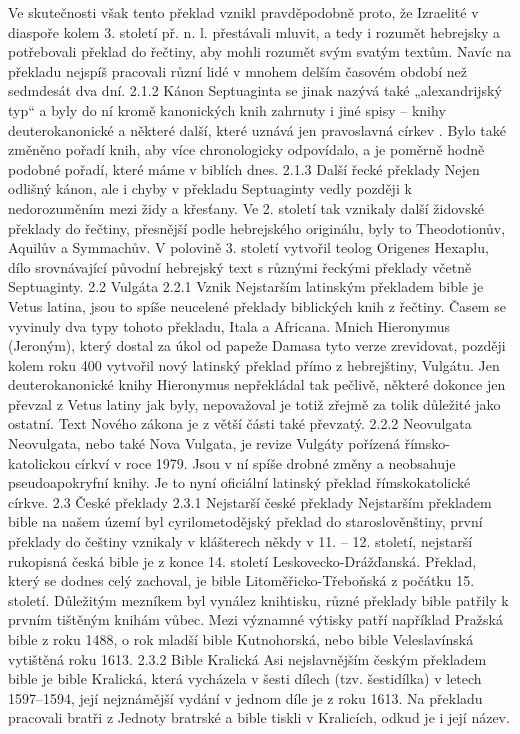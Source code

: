 \documentclass[letterpaper,12pt,oneside]{article}
\begin{document}
\begin{itemize}
Ve skutečnosti však tento překlad vznikl pravděpodobně proto, že Izraelité v diaspoře kolem 3. století př. n. l. přestávali mluvit, a tedy i rozumět hebrejsky a potřebovali překlad do řečtiny, aby mohli rozumět svým svatým textům. Navíc na překladu nejspíš pracovali různí lidé v mnohem delším časovém období než sedmdesát dva dní.
2.1.2	Kánon
Septuaginta se jinak nazývá také „alexandrijský typ“ a byly do ní kromě kanonických knih zahrnuty i jiné spisy – knihy deuterokanonické a některé další, které uznává jen pravoslavná církev . Bylo také změněno pořadí knih, aby více chronologicky odpovídalo, a je poměrně hodně podobné pořadí, které máme v biblích dnes.
2.1.3	Další řecké překlady
Nejen odlišný kánon, ale i chyby v překladu Septuaginty vedly později k nedorozuměním mezi židy a křesťany. Ve 2. století tak vznikaly další židovské překlady do řečtiny, přesnější podle hebrejského originálu, byly to Theodotionův, Aquilův a Symmachův. V polovině 3. století vytvořil teolog Origenes Hexaplu, dílo srovnávající původní hebrejský text s různými řeckými překlady včetně Septuaginty.  
2.2	Vulgáta
2.2.1	Vznik
Nejstarším latinským překladem bible je Vetus latina, jsou to spíše neucelené překlady biblických knih z řečtiny. Časem se vyvinuly dva typy tohoto překladu, Itala a Africana. Mnich Hieronymus (Jeroným), který dostal za úkol od papeže Damasa tyto verze zrevidovat, později kolem roku 400 vytvořil nový latinský překlad přímo z hebrejštiny, Vulgátu. Jen deuterokanonické knihy Hieronymus nepřekládal tak pečlivě, některé dokonce jen převzal z Vetus latiny jak byly, nepovažoval je totiž zřejmě za tolik důležité jako ostatní.  Text Nového zákona je z větší části také převzatý.
2.2.2	Neovulgata
Neovulgata, nebo také Nova Vulgata, je revize Vulgáty pořízená římsko-katolickou církví v roce 1979. Jsou v ní spíše drobné změny a neobsahuje pseudoapokryfní knihy. Je to nyní oficiální latinský překlad římskokatolické církve. 
2.3	České překlady
2.3.1	Nejstarší české překlady
Nejstarším překladem bible na našem území byl cyrilometodějský překlad do staroslověnštiny, první překlady do češtiny vznikaly v klášterech někdy v 11. – 12. století, nejstarší rukopisná česká bible je z konce 14. století Leskovecko-Drážďanská. Překlad, který se dodnes celý zachoval, je bible Litoměřicko-Třeboňská z počátku 15. století.
Důležitým mezníkem byl vynález knihtisku, různé překlady bible patřily k prvním tištěným knihám vůbec. Mezi významné výtisky patří například Pražská bible z roku 1488, o rok mladší bible Kutnohorská, nebo bible Veleslavínská vytištěná roku 1613.  
2.3.2	Bible Kralická
Asi nejslavnějším českým překladem bible je bible Kralická, která vycházela v šesti dílech (tzv. šestidílka) v letech 1597–1594, její nejznámější vydání v jednom díle je z roku 1613. Na překladu pracovali bratři z Jednoty bratrské a bible tiskli v Kralicích, odkud je i její název.

\end{itemize}
\end{document}
